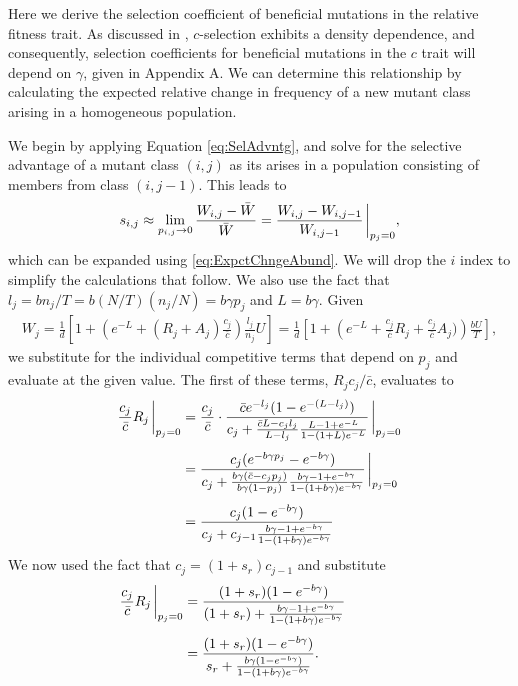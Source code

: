 \documentclass[9pt,twocolumn,twoside]{article}
\begin{document}
\begin{appendix}
Here we derive the selection coefficient of beneficial mutations in the relative fitness trait. As discussed in \citet[][section 3.2]{bertram2019density}, $c$-selection exhibits a density dependence, and consequently, selection coefficients for beneficial mutations in the $c$ trait will depend on $\gamma$, given in Appendix A. We can determine this relationship by calculating the expected relative change in frequency of a new mutant class arising in a homogeneous population. 

We begin by applying Equation \eqref{eq:SelAdvntg}, and solve for the selective advantage of a mutant class $(i,j)$ as its arises in a population consisting of members from class $(i,j-1)$. This leads to
\[
s_{i,j} \approx \lim_{p_{i,j}\rightarrow 0} \frac{W_{i,j}-\bar{W}}{\bar{W}} = \frac{W_{i,j}-W_{i,j-1}}{W_{i,j-1}}\eval_{p_j=0},
\]
which can be expanded using \eqref{eq:ExpctChngeAbund}. We will drop the $i$ index to simplify the calculations that follow. We also use the fact that $l_j = bn_j/T = b(N/T)(n_j/N) = b\gamma p_j$ and $L=b\gamma$. Given 
\[
\begin{aligned}
W_j = \frac{1}{d}\left[1+\left(e^{-L} +(R_j+A_j)\frac{c_j}{\bar{c}}\right)\frac{l_j}{n_j}U\right] = \frac{1}{d}\left[1+\left(e^{-L} +\frac{c_j}{\bar{c}}R_j+ \frac{c_j}{\bar{c}}A_j)\right)\frac{bU}{T}\right],
\end{aligned}
\]
we substitute for the individual competitive terms that depend on $p_j$ and evaluate at the given value. The first of these terms, $R_j c_j/\bar{c}$, evaluates to
\[
\begin{aligned}
\frac{c_j}{\bar{c}} R_j\eval_{p_j=0} &= \frac{c_j}{\bar{c}} \cdot \frac{\bar{c}e^{-l_{j}}(1-e^{-(L-l_{j})})}{c_j +\frac{\bar{c}L-c_jl_{j}}{L-l_{j}}\frac{L-1+e^{-L}}{1-(1+L)e^{-L}}}\eval_{p_j=0} \\[4pt]
&= 
\frac{c_j(e^{-b\gamma p_j}-e^{-b\gamma})}{c_j +\frac{b\gamma (\bar{c}-c_jp_j)}{b\gamma (1-p_j)}\frac{b\gamma-1+e^{-b\gamma}}{1-(1+b\gamma)e^{-b\gamma}}}\eval_{p_j=0} \\[4pt]
&= \frac{c_j(1-e^{-b\gamma})}{c_j +c_{j-1}\frac{b\gamma-1+e^{-b\gamma}}{1-(1+b\gamma)e^{-b\gamma}}} 
\end{aligned}
\]
We now used the fact that $c_j = (1+s_r)c_{j-1}$ and substitute
\[
\begin{aligned}
\frac{c_j}{\bar{c}}R_j\eval_{p_j=0}&= \frac{(1+s_r)(1-e^{-b\gamma})}{(1+s_r) +\frac{b\gamma-1+e^{-b\gamma}}{1-(1+b\gamma)e^{-b\gamma}}} \\[4pt]
&= \frac{(1+s_r)(1-e^{-b\gamma})}{s_r + \frac{b\gamma(1-e^{-b\gamma})}{1-(1+b\gamma)e^{-b\gamma}}}.\hspace{.8in}

\end{aligned}\]
\end{appendix}
\end{document}
